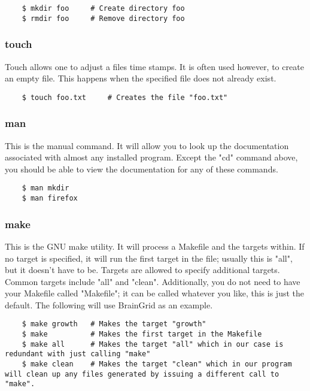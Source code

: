 	\begin{verbatim}
	$ mkdir foo		# Create directory foo
	$ rmdir foo		# Remove directory foo
	\end{verbatim}

\subsubsection{touch} \mdseries
Touch allows one to adjust a files time stamps.  It is often used however, to create an empty file.  This happens when the specified file does not already exist.

	\begin{verbatim}
	$ touch foo.txt		# Creates the file "foo.txt"
	\end{verbatim}

\subsubsection{man} \mdseries
This is the manual command.  It will allow you to look up the documentation associated with almost any installed program.  Except the "cd" command above, you should be able to view the documentation for any of these commands.

	\begin{verbatim}
	$ man mkdir
	$ man firefox
	\end{verbatim}

\subsubsection{make} \mdseries
This is the GNU make utility.  It will process a Makefile and the targets within.  If no target is specified, it will run the first target in the file; usually this is "all", but it doesn't have to be.  Targets are allowed to specify additional targets.  Common targets include "all" and "clean".  Additionally, you do not need to have your Makefile called "Makefile"; it can be called whatever you like, this is just the default.  The following will use BrainGrid as an example.  

	\begin{verbatim}
	$ make growth	# Makes the target "growth"
	$ make			# Makes the first target in the Makefile
	$ make all		# Makes the target "all" which in our case is redundant with just calling "make"
	$ make clean	# Makes the target "clean" which in our program will clean up any files generated by issuing a different call to "make".
	\end{verbatim}


